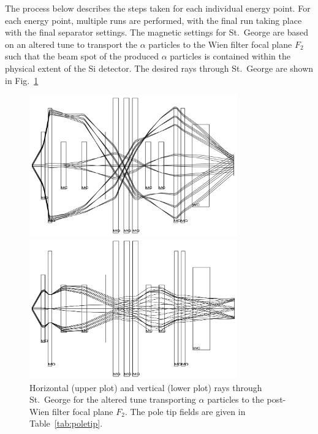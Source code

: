 The process below describes the steps taken for each individual energy
point. For each energy point, multiple runs are performed, with the
final run taking place with the final separator settings. The magnetic
settings for St.\ George are based on an altered tune to transport the
$\alpha$ particles to the Wien filter focal plane $F_2$ such that the
beam spot of the produced $\alpha$ particles is contained within the
physical extent of the Si detector. The desired rays through St.\ George
are shown in Fig.~\ref{fig:raytrace-altered}

\begin{figure}
    \begin{center}
        \centerline{\includegraphics[width=0.8\textwidth]{figures/optimal_tune_x.png}}
        \centerline{\includegraphics[width=0.8\textwidth]{figures/optimal_tune_y.png}}
        \caption[Horizontal and vertical rays through St.\
            George for $\alpha$ particles]{Horizontal (upper plot) and
            vertical (lower plot) rays through St.\ George for the
            altered tune transporting $\alpha$ particles to the
            post-Wien filter focal plane $F_2$. The pole tip fields are
            given in Table~\ref{tab:poletip}.}
        \label{fig:raytrace-altered}
    \end{center}
\end{figure}

